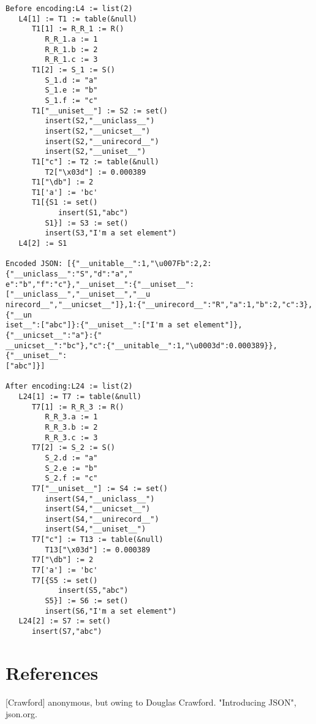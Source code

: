 \documentclass[letterpaper,12pt]{article}
\begin{document}
\begin{verbatim}
Before encoding:L4 := list(2)
   L4[1] := T1 := table(&null)
      T1[1] := R_R_1 := R()
         R_R_1.a := 1
         R_R_1.b := 2
         R_R_1.c := 3
      T1[2] := S_1 := S()
         S_1.d := "a"
         S_1.e := "b"
         S_1.f := "c"
      T1["__uniset__"] := S2 := set()
         insert(S2,"__uniclass__")
         insert(S2,"__unicset__")
         insert(S2,"__unirecord__")
         insert(S2,"__uniset__")
      T1["c"] := T2 := table(&null)
         T2["\x03d"] := 0.000389
      T1["\db"] := 2
      T1['a'] := 'bc'
      T1[{S1 := set()
            insert(S1,"abc")
         S1}] := S3 := set()
         insert(S3,"I'm a set element")
   L4[2] := S1

Encoded JSON: [{"__unitable__":1,"\u007Fb":2,2:{"__uniclass__":"S","d":"a","
e":"b","f":"c"},"__uniset__":{"__uniset__":["__uniclass__","__uniset__","__u
nirecord__","__unicset__"]},1:{"__unirecord__":"R","a":1,"b":2,"c":3},{"__un
iset__":["abc"]}:{"__uniset__":["I'm a set element"]},{"__unicset__":"a"}:{"
__unicset__":"bc"},"c":{"__unitable__":1,"\u0003d":0.000389}},{"__uniset__":
["abc"]}]

After encoding:L24 := list(2)
   L24[1] := T7 := table(&null)
      T7[1] := R_R_3 := R()
         R_R_3.a := 1
         R_R_3.b := 2
         R_R_3.c := 3
      T7[2] := S_2 := S()
         S_2.d := "a"
         S_2.e := "b"
         S_2.f := "c"
      T7["__uniset__"] := S4 := set()
         insert(S4,"__uniclass__")
         insert(S4,"__unicset__")
         insert(S4,"__unirecord__")
         insert(S4,"__uniset__")
      T7["c"] := T13 := table(&null)
         T13["\x03d"] := 0.000389
      T7["\db"] := 2
      T7['a'] := 'bc'
      T7[{S5 := set()
            insert(S5,"abc")
         S5}] := S6 := set()
         insert(S6,"I'm a set element")
   L24[2] := S7 := set()
      insert(S7,"abc")
\end{verbatim}

\newpage
\section*{References}

[Crawford] anonymous, but owing to Douglas Crawford.
"Introducing JSON", json.org.
\end{document}

